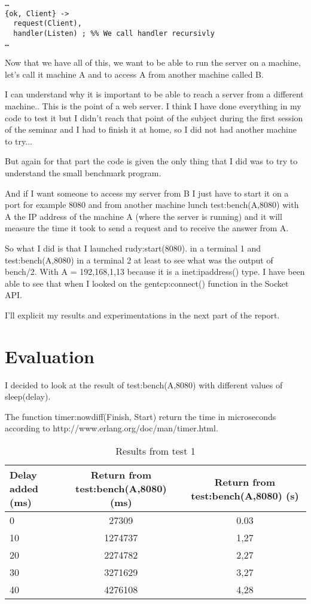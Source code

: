 \documentclass[a4paper, 11pt]{article}
\begin{document}
\begin{verbatim}
…
{ok, Client} ->
  request(Client),
  handler(Listen) ; %% We call handler recursivly
…
\end{verbatim}

Now that we have all of this, we want to be able to run the server on a machine, let's call it machine A and to access A from another machine called B. 

I can understand why it is important to be able to reach a server from a different machine.. This is the point of a web server. I think I have done everything in my code to test it but I didn't reach that point of the subject during the first session of the seminar and I had to finish it at home, so I did not had another machine to try... 

But again for that part the code is given the only thing that I did was to try to understand the small benchmark program.

And if I want someone to access my server from B I just have to start it on a port for example 8080 and from another machine lunch test:bench(A,8080) with A the IP address of the machine A (where the server is running) and it will measure the time it took to send a request and to receive the answer from A. 

So what I did is that I launched rudy:start(8080). in a terminal 1 and test:bench(A,8080) in a terminal 2 at least to see what was the output of bench/2. With A = {192,168,1,13} because it is a inet:ipaddress() type. I have been able to see that when I looked on the gentcp:connect() function in the Socket API. 

I'll explicit my results and experimentations in the next part of the report.
\newpage
\section{Evaluation}

I decided to look at the result of test:bench(A,8080) with different values of sleep(delay).

The function timer:nowdiff(Finish, Start) return the time in microseconds according to http://www.erlang.org/doc/man/timer.html. 

\begin{table}[h]
\begin{tabular}{lcc}
Delay added (ms) & Return from test:bench(A,8080) (ms) & Return from test:bench(A,8080) (s) \\\hline
0 & 27309 & 0.03 \\\hline
10 & 1274737 & 1,27 \\\hline
20 & 2274782 & 2,27 \\\hline
30 & 3271629 & 3,27 \\\hline
40 & 4276108 & 4,28 \\\hline
\end{tabular}
\caption{Results from test 1}
\label{tab:results}
\end{table}
\end{document}
